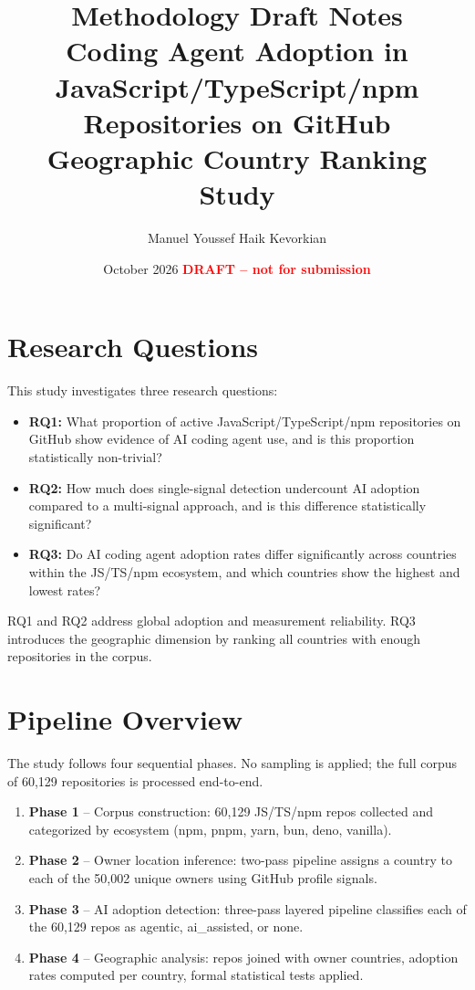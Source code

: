 \documentclass[12pt,a4paper]{article}
\title{\textbf{Methodology Draft Notes}\\
\large Coding Agent Adoption in JavaScript/TypeScript/npm Repositories on GitHub\\
\large Geographic Country Ranking Study}
\author{Manuel Youssef Haik Kevorkian}
\date{October 2026 \quad\textcolor{red}{\textbf{DRAFT -- not for submission}}}
\begin{document}
\maketitle
\tableofcontents
\newpage

\section{Research Questions}

This study investigates three research questions:

\begin{itemize}
  \item \textbf{RQ1:} What proportion of active JavaScript/TypeScript/npm repositories
        on GitHub show evidence of AI coding agent use, and is this proportion
        statistically non-trivial?

  \item \textbf{RQ2:} How much does single-signal detection undercount AI adoption
        compared to a multi-signal approach, and is this difference statistically
        significant?

  \item \textbf{RQ3:} Do AI coding agent adoption rates differ significantly across
        countries within the JS/TS/npm ecosystem, and which countries show the highest
        and lowest rates?
\end{itemize}

RQ1 and RQ2 address global adoption and measurement reliability. RQ3 introduces the
geographic dimension by ranking all countries with enough repositories in the corpus.

\section{Pipeline Overview}

The study follows four sequential phases. No sampling is applied; the full corpus of
60,129 repositories is processed end-to-end.

\begin{enumerate}
  \item \textbf{Phase 1} -- Corpus construction: 60,129 JS/TS/npm repos collected and
        categorized by ecosystem (npm, pnpm, yarn, bun, deno, vanilla).
  \item \textbf{Phase 2} -- Owner location inference: two-pass pipeline assigns a country
        to each of the 50,002 unique owners using GitHub profile signals.
  \item \textbf{Phase 3} -- AI adoption detection: three-pass layered pipeline classifies
        each of the 60,129 repos as agentic, ai\_assisted, or none.
  \item \textbf{Phase 4} -- Geographic analysis: repos joined with owner countries,
        adoption rates computed per country, formal statistical tests applied.
\end{enumerate}
\end{document}
